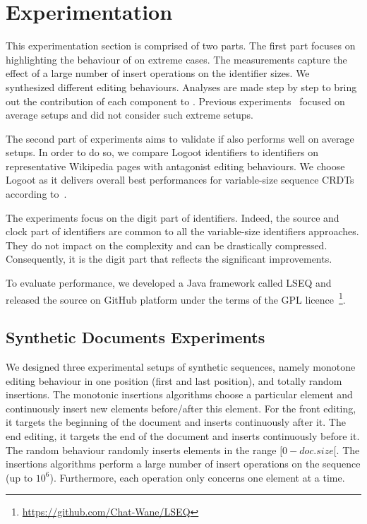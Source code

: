 \section{Experimentation}
\label{sec:validation}

This experimentation section is comprised of two parts. The first part focuses
on highlighting the behaviour of \NAME{} on extreme cases. The measurements
capture the effect of a large number of insert operations on the identifier
sizes. We synthesized different editing behaviours. Analyses are made step by
step to bring out the contribution of each component to \NAME{}. Previous
experiments~\cite{ahmed2011evaluating,preguica2009commutative,weiss2009logoot}
focused on average setups and did not consider such extreme setups.

The second part of experiments aims to validate if \NAME{} also performs well
on average setups.  In order to do so, we compare Logoot identifiers to \NAME{}
identifiers on representative Wikipedia pages with antagonist editing
behaviours. We choose Logoot as it delivers overall best performances for
variable-size sequence CRDTs according to~\cite{ahmed2011evaluating}.

The experiments focus on the digit part of identifiers. Indeed, the source and
clock part of identifiers are common to all the variable-size identifiers
approaches. They do not impact on the complexity and can be drastically
compressed. Consequently, it is the digit part that reflects the significant
improvements.

To evaluate \NAME{} performance, we developed a Java framework called LSEQ and
released the source on GitHub platform under the terms of the GPL
licence~\footnote{\url{https://github.com/Chat-Wane/LSEQ}}.

\subsection{Synthetic Documents Experiments}
\label{ssec:components}

We designed three experimental setups of synthetic sequences, namely monotone
editing behaviour in one position (first and last position), and totally random
insertions. The monotonic insertions algorithms choose a particular element and
continuously insert new elements before/after this element. For the front
editing, it targets the beginning of the document and inserts
continuously after it. The end editing, it targets the end of the
document and inserts continuously before it. The random behaviour randomly
inserts elements in the range $[0-doc.size[$. The insertions algorithms perform
a large number of insert operations on the sequence (up to
$10^6$). Furthermore, each operation only concerns one element at a time.

